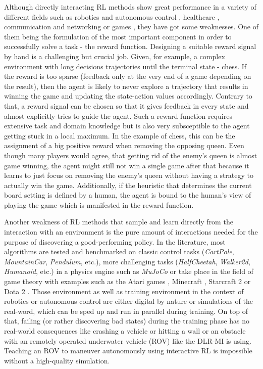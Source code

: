 Although directly interacting RL methods show great performance in a variety of different fields such as robotics and autonomous control \cite[]{etemad2020using, patil2021deep, wang2018reinforcement}, healthcare \cite[]{tseng2017deep, yu2019incorporating},  communication and networking \cite[]{chinchali2018cellular, fadlullah2017state}  or games \cite[]{berner2019dota, mnih2013playing, wu2016training}, they have got some weaknesses. One of them being the formulation of the most important component in order to successfully solve a task - the reward function. Designing a suitable reward signal by hand is a challenging but crucial job. Given, for example, a complex environment with long decisions trajectories until the terminal state - chess. If the reward is too sparse (feedback only at the very end of a game depending on the result), then the agent is likely to never explore a trajectory that results in winning the game and updating the state-action values accordingly. Contrary to that, a reward signal can be chosen so that it gives feedback in every state and almost explicitly tries to guide the agent. Such a reward function requires extensive task and domain knowledge but is also very subsceptible to the agent getting stuck in a local maximum. In the example of chess, this can be the assignment of a big positive reward when removing the opposing queen. Even though many players would agree, that getting rid of the enemy's queen is almost game winning, the agent might still not win a single game after that because it learns to just focus on removing the enemy's queen without having a strategy to actually win the game. Additionally, if the heuristic that determines the current board setting is defined by a human, the agent is bound to the human's view of playing the game which is manifested in the reward function. 
\par
Another weakness of RL methods that sample and learn directly from the interaction with an environment is the pure amount of interactions needed for the purpose of discovering a good-performing policy. In the literature, most algorithms are tested and benchmarked on classic control tasks (\textit{CartPole}, \textit{MountainCar}, \textit{Pendulum}, etc.), more challenging tasks (\textit{HalfCheetah}, \textit{Walker2d}, \textit{Humanoid}, etc.) in a physics engine such as \textit{MuJoCo} \cite[]{todorov2012mujoco} or take place in the field of game theory with examples such as the Atari games \cite[]{mnih2013playing}, Minecraft \cite[]{johnson2016malmo}, Starcraft 2 \cite[]{vinyals2019grandmaster} or Dota 2 \cite[]{berner2019dota}. Those environment as well as training environment in the context of robotics or autonomous control are either digital by nature or simulations of the real-word, which can be sped up and run in parallel during training. On top of that, failing (or rather discovering bad states) during the training phase has no real-world consequences like crashing a vehicle or hitting a wall or an obstacle with an remotely operated underwater vehicle (ROV) like the DLR-MI is using. Teaching an ROV to maneuver autonomously using interactive RL is impossible without a high-quality simulation.
